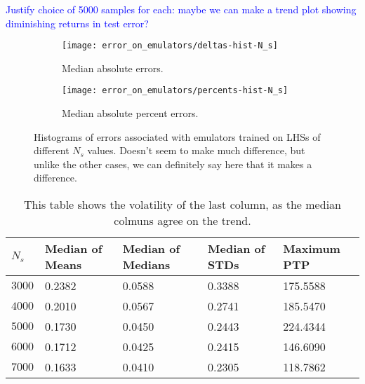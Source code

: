 \textcolor{blue}{Justify choice of 5000 samples for each: maybe we can make a
trend plot showing diminishing returns in test error?}

\begin{figure}[ht!]
    \begin{subfigure}{0.35 \textheight}
    \centering
 		\texttt{[image: error\_on\_emulators/deltas-hist-N\_s]}
 		\caption{Median absolute errors.}
 		\label{fig: Ns_experiment_deltas}
    \end{subfigure}
    \begin{subfigure}{0.35 \textheight}
    \centering
 		\texttt{[image: error\_on\_emulators/percents-hist-N\_s]}
 		\caption{Median absolute percent errors.}
 		\label{fig: Ns_experiment_percerr}
    \end{subfigure}
        \centering
    \caption[Impact of $s^*$ on Accuracy]
    		{Histograms of errors associated with emulators trained on LHSs of
    			different $N_s$ values. Doesn't seem to make much difference,
    			but unlike the other cases, we can definitely say here that it
    			makes a difference.}
    \label{fig: Ns_experiment}
\end{figure}

\begin{table}[ht!]
\centering
\begin{tabular}{l|l|l|l|l}
\hline
$N_s$ & Median of Means & Median of Medians & Median of STDs & Maximum PTP \\ \hline
$3000$ & 0.2382 & 0.0588 & 0.3388 & 175.5588 \\
$4000$ & 0.2010 & 0.0567 & 0.2741 & 185.5470 \\
$5000$ & 0.1730 & 0.0450 & 0.2443 & 224.4344 \\
$6000$ & 0.1712 & 0.0425 & 0.2415 & 146.6090 \\
$7000$ & 0.1633 & 0.0410 & 0.2305 & 118.7862 \\
\end{tabular}
	\cprotect\caption[$N_s$ Experiment: Deltas Statistics]{This table shows
		the volatility of the last column, as the median colmuns agree on the
		trend.}
 \label{tab: Ns_experiment_deltas_stats}
\end{table}

